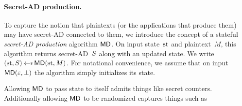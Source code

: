 \paragraph{Secret-AD production. } To capture the notion that plaintexts (or the applications that produce them) may have secret-AD connected to them, we introduce the concept of a stateful \emph{secret-AD production} algorithm $\mathsf{MD}$.  On input state~$\mathrm{st}$ and plaintext~$M$, this algorithm returns secret-AD~$S$ along with an updated state.  We write $(\st,S) \getsr \mdalg(\st,M)$.  For notational convenience, we assume that on input $\mathsf{MD}(\varepsilon,\bot)$ the algorithm simply initializes its state.

Allowing $\mathsf{MD}$ to pass state to itself admits things like secret counters.  Additionally allowing $\mathsf{MD}$ to be randomized captures things such as  




